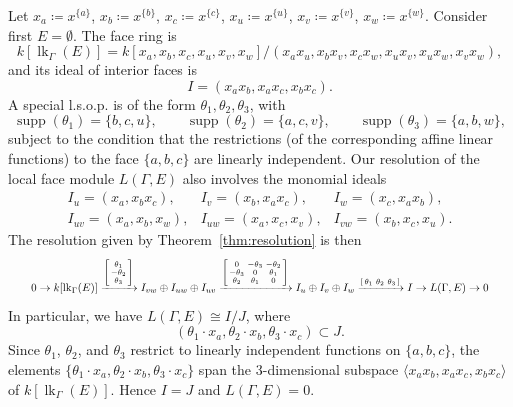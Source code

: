 \documentclass[ALCO, Unicode,published]{cedram}
\DeclareMathOperator{\lk}{lk}
\DeclareMathOperator{\supp}{supp}
\begin{document}
\begin{example}
Let $x_a  \coloneqq  x^{\{ a \}}$, 
$x_b  \coloneqq  x^{ \{ b \} }$, 
$x_c  \coloneqq  x^{\{ c \}}$, 
$x_u  \coloneqq  x^{\{ u \}}$, 
$x_v  \coloneqq  x^{\{ v \}}$, 
$x_w  \coloneqq  x^{\{ w \}}$. 
Consider first $E = \emptyset$.  The face ring is 
\[
k[\lk_\Gamma(E)] = k[x_{a},x_{b},x_{c},x_{u},x_{v},x_{w}]/(x_{a}x_{u},x_{b}x_{v},x_{c}x_{w},x_{u}x_{v},x_{u}x_{w},x_{v}x_{w}),
\]
and its ideal of interior faces is 
\[
I = (x_ax_b, x_ax_c, x_bx_c).
\]
A special l.s.o.p. is of the form $\theta_1, \theta_2, \theta_3$, with
\[
\supp(\theta_1) = \{ b,c,u\}, \quad \quad \supp(\theta_2) = \{ a,c,v\}, \quad \quad \supp(\theta_3) = \{ a,b,w\},
\]
subject to the condition that the restrictions (of the corresponding affine linear functions) to the face $\{a, b, c\}$ are linearly independent. Our resolution of the local face module $L(\Gamma, E)$ also involves the monomial ideals
\[
\begin{array}{ccc}
I_u = (x_a, x_bx_c), & I_v = (x_b, x_ax_c), & I_w = (x_c, x_ax_b), \\ I_{uv} = (x_a, x_b, x_w), & I_{uw} = (x_a, x_c, x_v), & I_{vw} = (x_b, x_c, x_u).
\end{array}
\]
The resolution given by Theorem~\ref{thm:resolution} is then 
\begin{equation*}
\resizebox{.95\hsize}{!}{$
0 \to k[\lk_\Gamma(E)] \xrightarrow{\begin{bsmallmatrix}
\theta_1 \\
-\theta_2 \\
\theta_3
\end{bsmallmatrix}} I_{vw} \oplus I_{uw} \oplus I_{uv}  \xrightarrow{\begin{bsmallmatrix} 
0 & -\theta_3 & -\theta_2\\
-\theta_3 & 0 & \theta_1\\
\theta_2 & \theta_1 & 0\\
 \end{bsmallmatrix} } I_u \oplus I_v \oplus I_w \xrightarrow{\begin{bsmallmatrix}
\theta_1 &
\theta_2 &
\theta_3
\end{bsmallmatrix}} I \to L(\Gamma, E) \to 0$}
\end{equation*}
In particular, we have $L(\Gamma, E) \cong I/J$, where 
\[
( \theta_1 \cdot x_a, \theta_2 \cdot x_b, \theta_3 \cdot x_c ) \subset J.
\] 
Since $\theta_1$, $\theta_2$, and $\theta_3$ restrict to linearly independent functions on $\{a, b,c\}$, the elements
$\{ \theta_1 \cdot x_a, \theta_2 \cdot x_b, \theta_3 \cdot x_c \}$
span the 3-dimensional subspace 
$\langle x_a x_b, x_a x_c, x_bx_c \rangle$ 
of $k[\lk_\Gamma(E)]$.  Hence $I = J$ and $L(\Gamma, E) = 0$.


\end{example}
\end{document}
